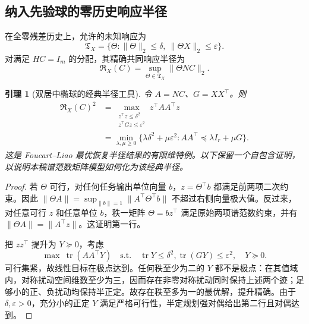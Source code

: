 \documentclass[11pt,a4paper]{article}
\numberwithin{equation}{section}
\newtheorem{lemma}[theorem]{引理}
\theoremstyle{definition}
\begin{document}
\subsection{纳入先验球的零历史响应半径}

在全零残差历史上，允许的未知响应为
\begin{equation}
 \mathfrak T_X=
 \{\Theta:\|\Theta\|_2\le\delta,\ \|\Theta X\|_2\le\varepsilon\}.
 \label{v44:eq:zero-history-consistency}
\end{equation}
对满足 $HC=I_m$ 的分配，其精确共同响应半径为
\begin{equation}
 \mathfrak R_X(C)=\sup_{\Theta\in\mathfrak T_X}\|\Theta NC\|_2.
 \label{v44:eq:exact-zero-radius}
\end{equation}

\begin{lemma}[双居中椭球的经典半径工具]
\label{v44:lem:two-ellipsoid}
令 $A=NC$、$G=XX^\top$。则
\begin{align}
 \mathfrak R_X(C)^2
 &=\max_{\substack{z^\top z\le\delta^2\\ z^\top Gz\le\varepsilon^2}}
          z^\top AA^\top z\nonumber\\
 &=\min_{\lambda,\mu\ge0}
 \{\lambda\delta^2+\mu\varepsilon^2:
       AA^\top\preceq\lambda I_r+\mu G\}.
 \label{v44:eq:two-ellipsoid-dual}
\end{align}
这是 Foucart--Liao 最优恢复半径结果的有限维特例\cite{foucart2024}。以下保留一个自包含证明，以说明本稿谱范数矩阵模型如何化为该经典半径。
\end{lemma}

\begin{proof}
若 $\Theta$ 可行，对任何任务输出单位向量 $b$，$z=\Theta^\top b$ 都满足前两项二次约束。因此 $\|\Theta A\|=\sup_{\|b\|=1}\|A^\top\Theta^\top b\|$ 不超过右侧向量极大值。反过来，对任意可行 $z$ 和任意单位 $b$，秩一矩阵 $\Theta=bz^\top$ 满足原始两项谱范数约束，并有 $\|\Theta A\|=\|A^\top z\|$。这证明第一行。

把 $zz^\top$ 提升为 $Y\succeq0$，考虑
\begin{equation}
 \max\ \operatorname{tr}(AA^\top Y)
 \quad\text{s.t.}\quad
 \operatorname{tr}Y\le\delta^2,
 \operatorname{tr}(GY)\le\varepsilon^2,
 \quad Y\succeq0.
\end{equation}
可行集紧，故线性目标在极点达到。任何秩至少为二的 $Y$ 都不是极点：在其值域内，对称扰动空间维数至少为三，因而存在非零对称扰动同时保持上述两个迹；足够小的正、负扰动均保持半正定。故存在秩至多为一的最优解，提升精确。由于 $\delta,\varepsilon>0$，充分小的正定 $Y$ 满足严格可行性，半定规划强对偶给出第二行且对偶达到。
\end{proof}
\end{document}
